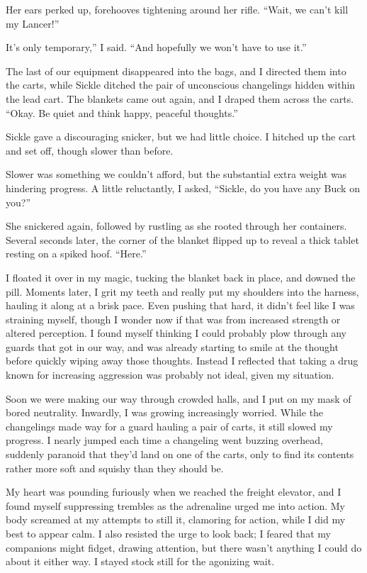 Her ears perked up, forehooves tightening around her rifle. “Wait, we can’t kill my Lancer!”

\leavevmode{}It’s only temporary,” I said. “And hopefully we won’t have to use it.”

The last of our equipment disappeared into the bags, and I directed them into the carts, while Sickle ditched the pair of unconscious changelings hidden within the lead cart. The blankets came out again, and I draped them across the carts. “Okay. Be quiet and think happy, peaceful thoughts.”

Sickle gave a discouraging snicker, but we had little choice. I hitched up the cart and set off, though slower than before.

Slower was something we couldn’t afford, but the substantial extra weight was hindering progress. A little reluctantly, I asked, “Sickle, do you have any Buck on you?”

She snickered again, followed by rustling as she rooted through her containers. Several seconds later, the corner of the blanket flipped up to reveal a thick tablet resting on a spiked hoof. “Here.”

I floated it over in my magic, tucking the blanket back in place, and downed the pill. Moments later, I grit my teeth and really put my shoulders into the harness, hauling it along at a brisk pace. Even pushing that hard, it didn’t feel like I was straining myself, though I wonder now if that was from increased strength or altered perception. I found myself thinking I could probably plow through any guards that got in our way, and was already starting to smile at the thought before quickly wiping away those thoughts. Instead I reflected that taking a drug known for increasing aggression was probably not ideal, given my situation.

Soon we were making our way through crowded halls, and I put on my mask of bored neutrality. Inwardly, I was growing increasingly worried. While the changelings made way for a guard hauling a pair of carts, it still slowed my progress. I nearly jumped each time a changeling went buzzing overhead, suddenly paranoid that they’d land on one of the carts, only to find its contents rather more soft and squishy than they should be.

My heart was pounding furiously when we reached the freight elevator, and I found myself suppressing trembles as the adrenaline urged me into action. My body screamed at my attempts to still it, clamoring for action, while I did my best to appear calm. I also resisted the urge to look back; I feared that my companions might fidget, drawing attention, but there wasn’t anything I could do about it either way. I stayed stock still for the agonizing wait.

